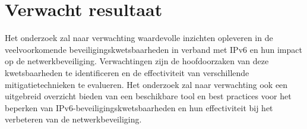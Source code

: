 \section{Verwacht resultaat}%
\label{sec:verwachte_resultaten}
 Het onderzoek zal naar verwachting waardevolle inzichten opleveren in de veelvoorkomende beveiligingskwetsbaarheden in verband met IPv6 en hun impact op de netwerkbeveiliging. Verwachtingen zijn de hoofdoorzaken van deze kwetsbaarheden te identificeren en de effectiviteit van verschillende mitigatietechnieken te evalueren. Het onderzoek zal naar verwachting ook een uitgebreid overzicht bieden van een beschikbare tool en best practices voor het beperken van IPv6-beveiligingskwetsbaarheden en hun effectiviteit bij het verbeteren van de netwerkbeveiliging.
